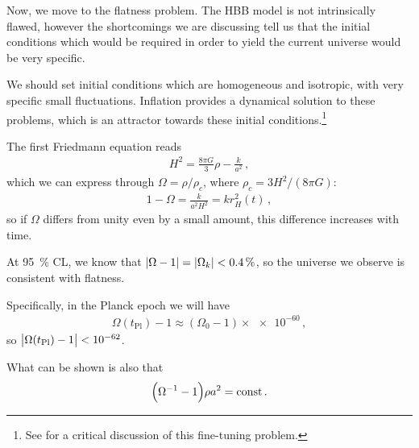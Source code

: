 \documentclass[main.tex]{subfiles}
\begin{document}

Now, we move to the flatness problem. 
The HBB model is not intrinsically flawed, however the shortcomings we are discussing tell us that the initial conditions which would be required in order to yield the current universe would be very specific.

We should set initial conditions which are homogeneous and isotropic, with very specific small fluctuations. Inflation provides a dynamical solution to these problems, which is an attractor towards these initial conditions.\footnote{See \textcite[]{hossenfelderScreamsExplanationFinetuning2019} for a critical discussion of this fine-tuning problem.}

The first Friedmann equation reads 
%
\begin{align}
H^2=  \frac{8 \pi G}{3} \rho - \frac{k}{a^2}
\,,
\end{align}
%
which we can express through \(\Omega = \rho / \rho _c\), where \(\rho _c = 3 H^2 / (8 \pi G) \): 
%
\begin{align}
1 - \Omega = \frac{k}{a^2 H^2} = k r_H^2 (t)
\,,
\end{align}
%
so if \(\Omega \) differs from unity even by a small amount, this difference increases with time. 

At \SI{95}{\percent} CL, we know that \(\abs{\Omega - 1} = \abs{\Omega _k} < \SI{.4}{\percent}\), so the universe we observe is consistent with flatness. 

Specifically, in the Planck epoch we will have 
%
\begin{align}
\Omega (t _{\text{Pl}}) - 1 \approx  (\Omega_0 - 1) \times \num{e-60}
\,,
\end{align}
%
so \(\abs{\Omega (t _{\text{Pl}}) - 1} < \num{e-62}\).

What can be shown is also that 
%
\begin{align}
\qty(\Omega^{-1} - 1) \rho a^2 = \text{const}
\,.
\end{align}
\end{document}
